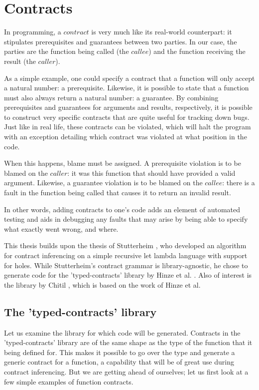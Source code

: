 \documentclass[10pt]{report}
\begin{document}
\section{Contracts}
In programming, a $contract$ is very much like its real-world counterpart: it stipulates prerequisites and guarantees between two parties.
In our case, the parties are the function being called (the $callee$) and the function receiving the result (the $caller$).

As a simple example, one could specify a contract that a function will only accept a natural number: a prerequisite.
Likewise, it is possible to state that a function must also always return a natural number: a guarantee.
By combining prerequisites and guarantees for arguments and results, respectively, it is possible to construct very specific contracts that are quite useful for tracking down bugs.
Just like in real life, these contracts can be violated, which will halt the program with an exception detailing which contract was violated at what position in the code.

When this happens, blame must be assigned.
A prerequisite violation is to be blamed on the $caller$: it was this function that should have provided a valid argument.
Likewise, a guarantee violation is to be blamed on the $callee$: there is a fault in the function being called that causes it to return an invalid result.

In other words, adding contracts to one's code adds an element of automated testing and aids in debugging any faults that may arise by being able to specify what exactly went wrong, and where.

This thesis builds upon the thesis of Stutterheim \cite{Stutterheim:2013:thesis}, who developed an algorithm for contract inferencing on a simple recursive let lambda language with support for holes.
While Stutterheim's contract grammar is library-agnostic, he chose to generate code for the 'typed-contracts' library by Hinze et al. \cite{Hinze06typedcontracts}. 
Also of interest is the library by Chitil \cite{Chitil:2012ua}, which is based on the work of Hinze et al.

\subsection{The 'typed-contracts' library}
Let us examine the library for which code will be generated.
Contracts in the 'typed-contracts' library are of the same shape as the type of the function that it being defined for.
This makes it possible to go over the type and generate a generic contract for a function, a capability that will be of great use during contract inferencing.
But we are getting ahead of ourselves; let us first look at a few simple examples of function contracts.
\end{document}
